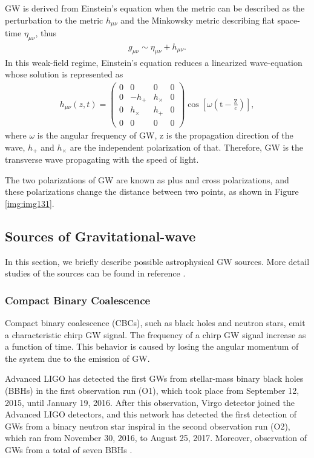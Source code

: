 GW is derived from Einstein's equation when the metric can be described as the perturbation to the metric $h_{\mu\nu}$ and the Minkowsky metric describing flat space-time $\eta_{\mu\nu}$, thus
\begin{eqnarray}
  g_{\mu \nu}\sim\eta_{\mu \nu}+h_{\mu \nu}.
\end{eqnarray}
In this weak-field regime, Einstein's equation reduces a linearized wave-equation whose solution is represented as
\begin{eqnarray}
  h_{\mu \nu}(z, t)=\left(\begin{array}{cccc}{0} & {0} & {0} & {0} \\ {0} & {-h_{+}} & {h_{\times}} & {0} \\ {0} & {h_{\times}} & {h_{+}} & {0} \\ {0} & {0} & {0} & {0}\end{array}\right) \cos \left[\omega\left(\mathrm{t}-\frac{\mathrm{Z}}{\mathrm{c}}\right)\right], \label{eq:eq130}
\end{eqnarray}
where $\omega$ is the angular frequency of GW, z is the propagation direction of the wave, $h_{+}$ and $h_{\times}$ are the independent polarization of that. Therefore, GW is the transverse wave propagating with the speed of light.

The two polarizations of GW are known as plus and cross polarizations, and these polarizations change the distance between two points, as shown in Figure \ref{img:img131}. 


\subsection{Sources of Gravitational-wave}
In this section, we briefly describe possible astrophysical GW sources. More detail studies of the sources can be found in reference \cite{cutler2002overview}.

\subsubsection{Compact Binary Coalescence}
Compact binary coalescence (CBCs), such as black holes and neutron stars, emit a characteristic chirp GW signal. The frequency of a chirp GW signal increase as a function of time. This behavior is caused by losing the angular momentum of the system due to the emission of GW.

Advanced LIGO has detected the first GWs from stellar-mass binary black holes (BBHs) in the first observation run (O1), which took place from September 12, 2015, until January 19, 2016. After this observation, Virgo detector joined the Advanced LIGO detectors, and this network has detected the first detection of GWs from a binary neutron star inspiral in the second observation run (O2), which ran from November 30, 2016, to August 25, 2017. Moreover, observation of GWs from a total of seven BBHs \cite{abbott2019gwtc}. 

